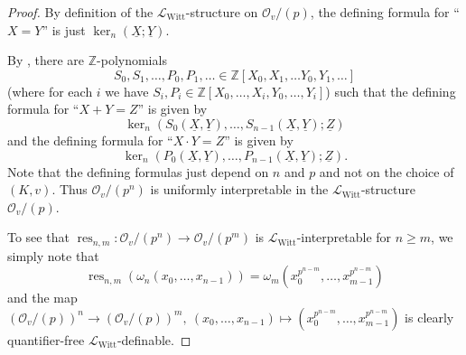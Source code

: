 \documentclass[a4paper]{amsart}
\theoremstyle{mystyle2}
\theoremstyle{mystyle}
\DeclareMathOperator{\res}{res}
\renewcommand{\vec}[1]{\underline{#1}}
\newcommand{\Z}{\mathbb{Z}}
\renewcommand{\L}{\mathcal{L}}
\newcommand{\LWitt}{\L_{\mathrm{Witt}}}
\renewcommand{\O}{\mathcal{O}}
\numberwithin{equation}{section}
\begin{document}
\begin{proof}
        By definition of the \(\LWitt\)-structure on \(\O_v/(p)\), the defining formula for \enquote{\(X=Y\)} is just \(\ker_n(\vec{X};\vec{Y})\).

        By \cite[Lemma~6.5]{vdd}, there are \(\Z\)-polynomials \[S_0,S_1,\ldots,P_0,P_1,\ldots\in \Z[X_0,X_1,\ldots Y_0,Y_1,\ldots]\] (where for each \(i\) we have \(S_i,P_i\in \Z[X_0,\ldots,X_i,Y_0,\ldots,Y_i]\)) such that 
        the defining formula for \enquote{\(X+Y=Z\)} is given by 
        \[
        \ker_n(S_0(\vec{X},\vec{Y}),\ldots,S_{n-1}(\vec{X},\vec{Y});\vec{Z})
        \] 
        and the defining formula for \enquote{\(X\cdot Y=Z\)} is given by
        \[
        \ker_n(P_0(\vec{X},\vec{Y}),\ldots,P_{n-1}(\vec{X},\vec{Y});\vec{Z}).
        \]
        Note that the defining formulas just depend on \(n\) and \(p\) and not on the choice of \( (K,v) \).
        Thus \(\O_v/(p^n)\) is uniformly interpretable in the 
        $\LWitt$-structure \(\O_v/(p)\).

        To see that $\res_{n, m}\colon \O_v/(p^n)\to \O_v/(p^m)$ is $\LWitt$-interpretable for $n\geq m$, we simply note that
        \[
        \res_{n,m}(\omega_n(x_0, \ldots, x_{n-1})) = \omega_m(x_0^{p^{n-m}}, \ldots, x_{m-1}^{p^{n-m}})
        \]
        and the map $(\O_v/(p))^n\to (\O_v/(p))^m,\ (x_0, \ldots, x_{n-1})\mapsto (x_0^{p^{n-m}}, \ldots, x_{m-1}^{p^{n-m}})$ is clearly quantifier-free $\LWitt$-definable.
    \end{proof}
\end{document}
